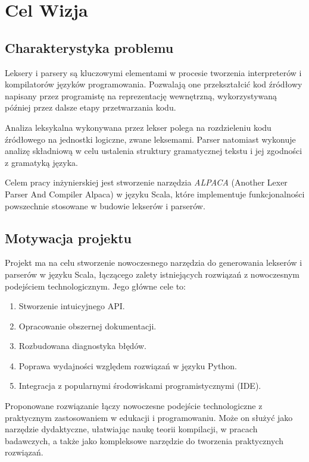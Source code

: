 \chapter{Cel Wizja}
\label{ch:cel-wizja}


\section{Charakterystyka problemu}
\label{sec:charakterystyka-problemu}
Leksery i parsery są kluczowymi elementami w procesie tworzenia interpreterów i kompilatorów języków programowania.
Pozwalają one przekształcić kod źródłowy napisany przez programistę na reprezentację wewnętrzną, wykorzystywaną później przez dalsze etapy przetwarzania kodu.

Analiza leksykalna wykonywana przez lekser polega na rozdzieleniu kodu źródłowego na jednostki logiczne, zwane leksemami.
Parser natomiast wykonuje analizę składniową w celu ustalenia struktury gramatycznej tekstu i jej zgodności z gramatyką języka.

Celem pracy inżynierskiej jest stworzenie narzędzia \textit{ALPACA} (Another Lexer Parser And Compiler Alpaca) w języku Scala, które implementuje funkcjonalności powszechnie stosowane w budowie lekserów i parserów.


\section{Motywacja projektu}
\label{sec:motywacja-projektu}

Projekt ma na celu stworzenie nowoczesnego narzędzia do generowania lekserów i parserów w języku Scala, łączącego zalety istniejących rozwiązań z nowoczesnym podejściem technologicznym.
Jego główne cele to:
\begin{enumerate}
    \item Stworzenie intuicyjnego API\@.
    \item Opracowanie obszernej dokumentacji.
    \item Rozbudowana diagnostyka błędów.
    \item Poprawa wydajności względem rozwiązań w języku Python.
    \item Integracja z popularnymi środowiskami programistycznymi (IDE).
\end{enumerate}

Proponowane rozwiązanie łączy nowoczesne podejście technologiczne z praktycznym zastosowaniem w edukacji i programowaniu.
Może on służyć jako narzędzie dydaktyczne, ułatwiając naukę teorii kompilacji, w pracach badawczych, a także jako kompleksowe narzędzie do tworzenia praktycznych rozwiązań.


